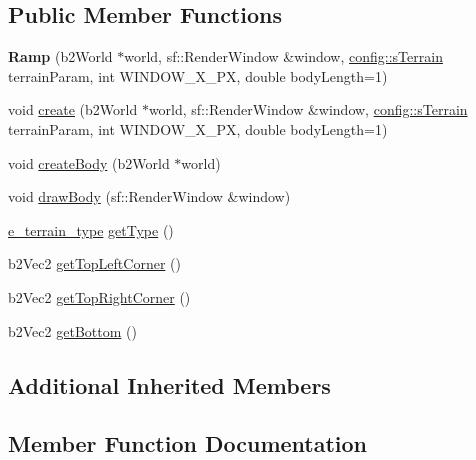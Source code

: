 \subsection*{Public Member Functions}
\begin{DoxyCompactItemize}
\item 
\mbox{\label{class_ramp_ad98b8011f89d359a95afe5e390443b03}} 
{\bfseries Ramp} (b2\+World $\ast$world, sf\+::\+Render\+Window \&window, \mbox{\hyperlink{structconfig_1_1s_terrain}{config\+::s\+Terrain}} terrain\+Param, int W\+I\+N\+D\+O\+W\+\_\+\+X\+\_\+\+PX, double body\+Length=1)
\item 
void \mbox{\hyperlink{class_ramp_a0dcb7d44807cb9ce61307c975b29f06e}{create}} (b2\+World $\ast$world, sf\+::\+Render\+Window \&window, \mbox{\hyperlink{structconfig_1_1s_terrain}{config\+::s\+Terrain}} terrain\+Param, int W\+I\+N\+D\+O\+W\+\_\+\+X\+\_\+\+PX, double body\+Length=1)
\item 
void \mbox{\hyperlink{class_ramp_a12049389b07cc2bff4932004c8357dd2}{create\+Body}} (b2\+World $\ast$world)
\item 
void \mbox{\hyperlink{class_ramp_ab05c0a8c5706488be4aba9c4f52f55c9}{draw\+Body}} (sf\+::\+Render\+Window \&window)
\item 
\mbox{\hyperlink{_terrain_8h_a6d0b7e83bb7325270c1162bece970fd8}{e\+\_\+terrain\+\_\+type}} \mbox{\hyperlink{class_ramp_a25dce9bce336a8524be1de1abd6f1af3}{get\+Type}} ()
\item 
b2\+Vec2 \mbox{\hyperlink{class_ramp_aefcb53f7b43d3706400e7f16c77a7e18}{get\+Top\+Left\+Corner}} ()
\item 
b2\+Vec2 \mbox{\hyperlink{class_ramp_a72b5d41278e4ff65df8f80657ae7d9e1}{get\+Top\+Right\+Corner}} ()
\item 
b2\+Vec2 \mbox{\hyperlink{class_ramp_a6e4926a2d16651162340113155e91e8f}{get\+Bottom}} ()
\end{DoxyCompactItemize}
\subsection*{Additional Inherited Members}


\subsection{Member Function Documentation}
\mbox{\label{class_ramp_a0dcb7d44807cb9ce61307c975b29f06e}} 
